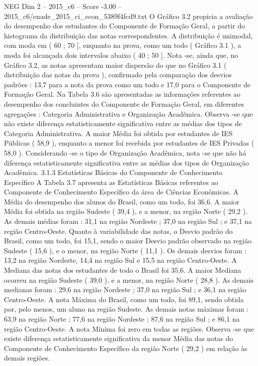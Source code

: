 \begin{textsample}{NEG Dim 2 – 2015\_c6 – Score -3.00 – 2015\_c6/enade\_2015\_ci\_econ\_5389f4fcd9.txt}
O Gráfico 3.2 propicia a avaliação do desempenho dos estudantes do Componente de Formação Geral, a partir do histograma da distribuição das notas correspondentes.
A distribuição é unimodal, com moda em ( 60 ; 70 ], enquanto na prova, como um todo ( Gráfico 3.1 ), a moda foi alcançada dois intervalos abaixo ( 40 ; 50 ].
Nota -se, ainda que, no Gráfico 3.2, as notas apresentam maior dispersão do que no Gráfico 3.1 ( distribuição das notas da prova ), confirmado pela comparação dos desvios padrões : 13,7 para a nota da prova como um todo e 17,0 para o Componente de Formação Geral.
Na Tabela 3.6 são apresentadas as informações referentes ao desempenho dos concluintes do Componente de Formação Geral, em diferentes agregações : Categoria Administrativa e Organização Acadêmica.
Observa -se que não existe diferença estatisticamente significativa entre as médias dos tipos de Categoria Administrativa.
A maior Média foi obtida por estudantes de IES Públicas ( 58,9 ), enquanto a menor foi recebida por estudantes de IES Privadas ( 58,0 ).
Considerando -se o tipo de Organização Acadêmica, nota -se que não há diferença estatisticamente significativa entre as médias dos tipos de Organização Acadêmica. 3.1.3 Estatísticas Básicas do Componente de Conhecimento Específico A Tabela 3.7 apresenta as Estatísticas Básicas referentes ao Componente de Conhecimento Específico da área de Ciências Econômicas.
A Média do desempenho dos alunos do Brasil, como um todo, foi 36,6.
A maior Média foi obtida na região Sudeste ( 39,4 ), e a menor, na região Norte ( 29,2 ).
As demais médias foram : 31,1 na região Nordeste ; 37,0 na região Sul ; e 37,1 na região Centro-Oeste.
Quanto à variabilidade das notas, o Desvio padrão do Brasil, como um todo, foi 15,1, sendo o maior Desvio padrão observado na região Sudeste ( 15,6 ), e o menor, na região Norte ( 11,1 ).
Os demais desvios foram : 13,2 na região Nordeste, 14,4 na região Sul e 15,5 na região Centro-Oeste.
A Mediana das notas dos estudantes de todo o Brasil foi 35,6.
A maior Mediana ocorreu na região Sudeste ( 39,0 ), e a menor, na região Norte ( 28,8 ).
As demais medianas foram : 29,6 na região Nordeste ; 37,0 na região Sul ; e 36,1 na região Centro-Oeste.
A nota Máxima do Brasil, como um todo, foi 89,1, sendo obtida por, pelo menos, um aluno na região Sudeste.
As demais notas máximas foram : 63,9 na região Norte ; 77,6 na região Nordeste ; 87,6 na região Sul ; e 86,1 na região Centro-Oeste.
A nota Mínima foi zero em todas as regiões.
Observa -se que existe diferença estatisticamente significativa da menor Média das notas do Componente de Conhecimento Específico da região Norte ( 29,2 ) em relação às demais regiões.

\end{textsample}
